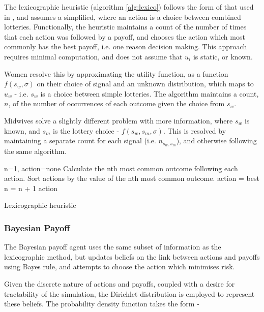 The lexicographic heuristic (algorithm \ref{alg:lexico}) follows the form of that used in \cite{Hau2008}, and assumes a simplified, where an action is a choice between combined lotteries. Functionally, the heuristic maintains a count of the number of times that each action was followed by a payoff, and chooses the action which most commonly has the best payoff, i.e. one reason decision making. This approach requires minimal computation, and does not assume that \(u_{i}\) is static, or known.

Women resolve this by approximating the utility function, as a function \(f(s_{w}, \sigma)\) on their choice of signal and an unknown distribution, which maps to \(u_{w}\) - i.e. \(s_{w}\) is a choice between simple lotteries. The algorithm maintains a count, \(n\), of the number of occurrences of each outcome given the choice from \(s_{w}\).

Midwives solve a slightly different problem with more information, where \(s_{w}\) is known, and \(s_{m}\) is the lottery choice - \(f(s_{w}, s_{m},\sigma)\). This is resolved by maintaining a separate count for each signal (i.e. \(n_{s_{w},s_{m}}\)), and otherwise following the same algorithm.

\begin{algorithm}
\begin{algorithmic}
\State n=1, action=none
\State Calculate the nth most common outcome following each action.
\State Sort actions by the value of the nth most common outcome.
 \State action = best \EndIf
\State n = n + 1
\EndWhile
\State \Return action
\end{algorithmic}
\caption{Lexicographic heuristic\label{alg:lexico}}
\end{algorithm}

\subsubsection{Bayesian Payoff}

The Bayesian payoff agent uses the same subset of information as the lexicographic method, but updates beliefs on the link between actions and payoffs using Bayes rule, and attempts to choose the action which minimises risk.

Given the discrete nature of actions and payoffs, coupled with a desire for tractability of the
simulation, the Dirichlet distribution is employed to represent these beliefs. The probability
density function takes the form -

